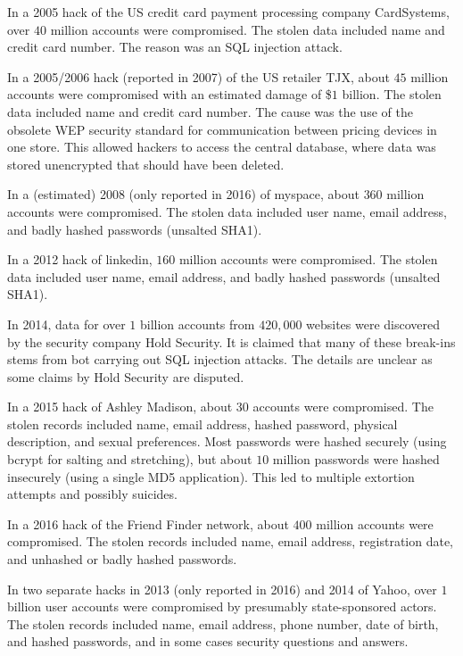 In a 2005 hack of the US credit card payment processing company CardSystems, over $40$ million accounts were compromised.
The stolen data included name and credit card number.
The reason was an SQL injection attack.

In a 2005/2006 hack (reported in 2007) of the US retailer TJX, about $45$ million accounts were compromised with an estimated damage of \$$1$ billion.
The stolen data included name and credit card number.
The cause was the use of the obsolete WEP security standard for communication between pricing devices in one store.
This allowed hackers to access the central database, where data was stored unencrypted that should have been deleted.

In a (estimated) 2008 (only reported in 2016) of myspace, about $360$ million accounts were compromised.
The stolen data included user name, email address, and badly hashed passwords (unsalted SHA1).

In a 2012 hack of linkedin, $160$ million accounts were compromised.
The stolen data included user name, email address, and badly hashed passwords (unsalted SHA1).

In 2014, data for over $1$ billion accounts from $420,000$ websites were discovered by the security company Hold Security.
It is claimed that many of these break-ins stems from bot carrying out SQL injection attacks.
The details are unclear as some claims by Hold Security are disputed.

In a 2015 hack of Ashley Madison, about $30$ accounts were compromised.
The stolen records included name, email address, hashed password, physical description, and sexual preferences.
Most passwords were hashed securely (using bcrypt for salting and stretching), but about $10$ million passwords were hashed insecurely (using a single MD5 application).
This led to multiple extortion attempts and possibly suicides.

In a 2016 hack of the Friend Finder network, about $400$ million accounts were compromised.
The stolen records included name, email address, registration date, and unhashed or badly hashed passwords.

In two separate hacks in 2013 (only reported in 2016) and 2014 of Yahoo, over $1$ billion user accounts were compromised by presumably state-sponsored actors.
The stolen records included name, email address, phone number, date of birth, and hashed passwords, and in some cases security questions and answers.

